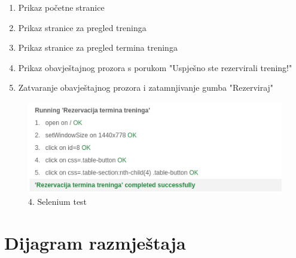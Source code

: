 		\begin{enumerate}
		    \item Prikaz početne stranice
                \item Prikaz stranice za pregled treninga
                \item Prikaz stranice za pregled termina treninga
                \item Prikaz obavještajnog prozora s porukom "Uspješno ste rezervirali trening!"
                \item Zatvaranje obavještajnog prozora i zatamnjivanje gumba "Rezerviraj"
		\end{enumerate}
            \begin{figure}[H]
		\includegraphics[scale=1]{./Slike/rezervacija_termina_treninga.png}
		\centering
		\caption{4. Selenium test}
		\label{fig:promjene}
	    \end{figure}
		
		\section{Dijagram razmještaja}
			
			
